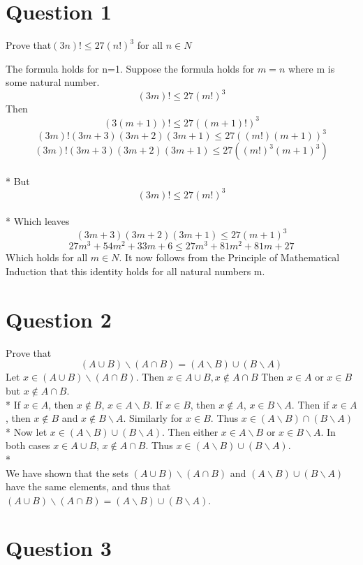 \documentclass[a4paper,12pt]{article}
\begin{document}
\section{Question 1}

Prove that$(3n)! \leq 27(n!)^3$ for all $n \in N$

The formula holds for n=1.
Suppose the formula holds for $m=n$ where m is some natural number.
\[ (3m)! \leq 27(m!)^3 \]
Then \[(3(m + 1))! \leq 27((m + 1)!)^3\]
\[(3m)!(3m + 3)(3m + 2)(3m + 1) \leq 27{((m!)(m + 1))}^3\]
\[(3m)!(3m + 3)(3m + 2)(3m + 1) \leq 27({(m!)}^3{(m + 1)}^3)\]
\\*
But \[(3m)! \leq 27(m!)^3\]
\\*
Which leaves \[(3m + 3)(3m + 2)(3m + 1) \leq 27{(m + 1)}^3\]
\[27{m}^3 + 54{m}^2 + 33m + 6 \leq 27{m}^3 + 81{m}^2 + 81m + 27\]
Which holds for all $m \in N$.
It now follows from the Principle of Mathematical Induction that this identity holds for all natural numbers m.

\section{Question 2}
Prove that \[(A \cup B) \backslash (A \cap B) = (A \backslash B) \cup (B \backslash A)\]
Let $x \in (A \cup B)\backslash(A \cap B)$. Then $x \in A \cup B, x \notin A \cap B$
Then $x \in A$ or $x \in B$ but $x \notin A \cap B$.
\\*
If $x \in A$, then $x \notin B$, $x \in A \backslash B$. If $x \in B$, then $x \notin A$, $x \in B \backslash A$.
Then if $x \in A$, then $x \notin B$ and $x \notin B \backslash A$. Similarly for $x \in B$.
Thus $x \in (A \backslash B) \cap (B \backslash A)$
\\*
Now let $x \in (A \backslash B) \cup (B \backslash A)$. Then either $x \in A \backslash B$ or $x \in B \backslash A$. 
In both cases $x \in A \cup B$, $x \notin A \cap B$. Thus $x \in (A \backslash B) \cup (B \backslash A)$.
\\*
\\
We have shown that the sets $(A \cup B) \backslash (A \cap B)$ and $(A \backslash B) \cup (B \backslash A)$
have the same elements, and thus that $(A \cup B) \backslash (A \cap B) = (A \backslash B) \cup (B \backslash A)$.

\section{Question 3}
\end{document}
